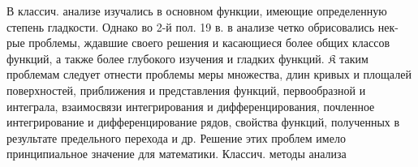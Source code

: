 \documentclass[10pt]{article}
\begin{document}
В классич. анализе изучались в основном функции, имеющие определенную степень гладкости. Однако во 2-й пол. 19 в. в анализе четко обрисовались нек-рые проблемы, ждавшие своего решения и касающиеся более общих классов функций, а также более глубокого изучения и гладких функций. $\mathfrak{K}$ таким проблемам следует отнести проблемы меры множества, длин кривых и площалей поверхностей, приближения и представления функций, первообразной и интеграла, взаимосвязи интегрирования и дифференцирования, почленное интегрирование и дифференцирование рядов, свойства функций, полученных в результате предельного перехода и др. Решение этих проблем имело принципиальное значение для математики. Классич. методы анализа
\end{document}
